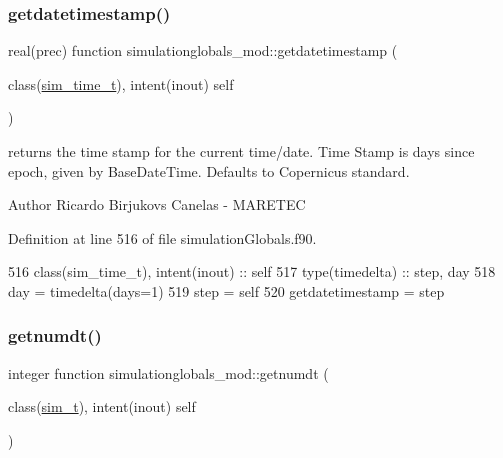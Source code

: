 \mbox{\label{namespacesimulationglobals__mod_a1fd33b50ae2216b3b7db074da1672398}} 
\subsubsection{\texorpdfstring{getdatetimestamp()}{getdatetimestamp()}}
{\footnotesize\ttfamily real(prec) function simulationglobals\+\_\+mod\+::getdatetimestamp (\begin{DoxyParamCaption}\item[{class(\mbox{\hyperlink{structsimulationglobals__mod_1_1sim__time__t}{sim\+\_\+time\+\_\+t}}), intent(inout)}]{self }\end{DoxyParamCaption})\hspace{0.3cm}{\ttfamily [private]}}



returns the time stamp for the current time/date. Time Stamp is days since epoch, given by Base\+Date\+Time. Defaults to Copernicus standard. 

\begin{DoxyAuthor}{Author}
Ricardo Birjukovs Canelas -\/ M\+A\+R\+E\+T\+EC 
\end{DoxyAuthor}


Definition at line 516 of file simulation\+Globals.\+f90.


\begin{DoxyCode}
516     \textcolor{keywordtype}{class}(sim\_time\_t), \textcolor{keywordtype}{intent(inout)} :: self
517     \textcolor{keywordtype}{type}(timedelta) :: step, day
518     day = timedelta(days=1)
519     step = self%
520     getdatetimestamp = step%
\end{DoxyCode}
\mbox{\label{namespacesimulationglobals__mod_af313959d6cbfc4cb0ab330aa094511c5}} 
\subsubsection{\texorpdfstring{getnumdt()}{getnumdt()}}
{\footnotesize\ttfamily integer function simulationglobals\+\_\+mod\+::getnumdt (\begin{DoxyParamCaption}\item[{class(\mbox{\hyperlink{structsimulationglobals__mod_1_1sim__t}{sim\+\_\+t}}), intent(inout)}]{self }\end{DoxyParamCaption})\hspace{0.3cm}{\ttfamily [private]}}



